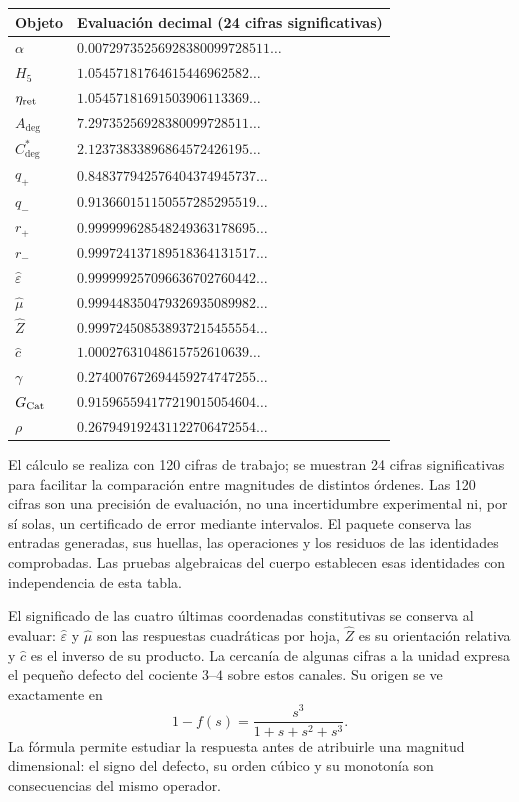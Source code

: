\begin{longtable}{@{}ll@{}}
\toprule
Objeto & Evaluación decimal (24 cifras significativas)\\
\midrule\endhead
$\alpha$ & $0.00729735256928380099728511\ldots$ \\
$H_5$ & $1.05457181764615446962582\ldots$ \\
$\eta_{\rm ret}$ & $1.05457181691503906113369\ldots$ \\
$A_{\deg}$ & $7.29735256928380099728511\ldots$ \\
$C^*_{\deg}$ & $2.12373833896864572426195\ldots$ \\
$q_+$ & $0.848377942576404374945737\ldots$ \\
$q_-$ & $0.913660151150557285295519\ldots$ \\
$r_+$ & $0.999999628548249363178695\ldots$ \\
$r_-$ & $0.999724137189518364131517\ldots$ \\
$\widehat\varepsilon$ & $0.999999257096636702760442\ldots$ \\
$\widehat\mu$ & $0.999448350479326935089982\ldots$ \\
$\widehat Z$ & $0.999724508538937215455554\ldots$ \\
$\widehat c$ & $1.00027631048615752610639\ldots$ \\
$\gamma$ & $0.274007672694459274747255\ldots$ \\
$G_{\rm Cat}$ & $0.915965594177219015054604\ldots$ \\
$\rho$ & $0.267949192431122706472554\ldots$ \\
\bottomrule
\end{longtable}


El cálculo se realiza con 120 cifras de trabajo; se muestran 24 cifras
significativas para facilitar la comparación entre magnitudes de distintos
órdenes. Las 120 cifras son una precisión de evaluación, no una incertidumbre
experimental ni, por sí solas, un certificado de error mediante intervalos.
El paquete conserva las entradas generadas, sus huellas, las operaciones y
los residuos de las identidades comprobadas. Las pruebas algebraicas del
cuerpo establecen esas identidades con independencia de esta tabla.

El significado de las cuatro últimas coordenadas constitutivas se conserva
al evaluar: $\widehat\varepsilon$ y $\widehat\mu$ son las respuestas
cuadráticas por hoja, $\widehat Z$ es su orientación relativa y
$\widehat c$ es el inverso de su producto. La cercanía de algunas cifras a
la unidad expresa el pequeño defecto del cociente $3$--$4$ sobre estos
canales. Su origen se ve exactamente en
\[
 1-f(s)=\frac{s^3}{1+s+s^2+s^3}.
\]
La fórmula permite estudiar la respuesta antes de atribuirle una magnitud
dimensional: el signo del defecto, su orden cúbico y su monotonía son
consecuencias del mismo operador.

